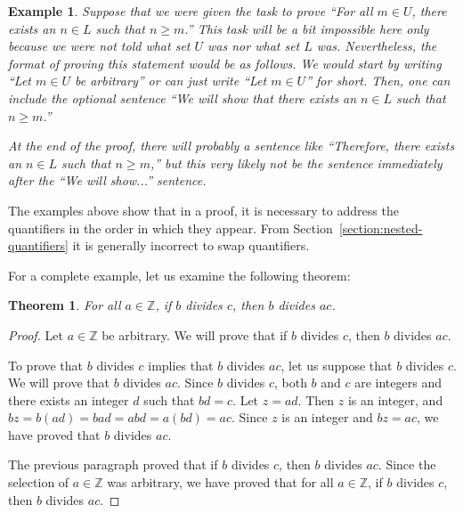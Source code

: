 \documentclass{book}
\newcounter{ekcounter}%
\theoremstyle{ekimcustom}
\newtheorem{theorem}[ekcounter]{Theorem}
\newtheorem{example}[ekcounter]{Example}
\begin{document}
\begin{example}
Suppose that we were given the task to prove ``For all $m \in U$, there exists an $n \in L$ such that $n \geq m$.'' This task will be a bit impossible here only because we were not told what set $U$ was nor what set $L$ was. Nevertheless, the format of proving this statement would be as follows. We would start by writing ``Let $m \in U$ be arbitrary'' or can just write ``Let $m \in U$'' for short. Then, one can include the optional sentence ``We will show that there exists an $n \in L$ such that $n \geq m$.''

At the end of the proof, there will probably a sentence like ``Therefore, there exists an $n \in L$ such that $n \geq m$,'' but this very likely not be the sentence immediately after the ``We will show...'' sentence.
\end{example}

The examples above show that in a proof, it is necessary to address the quantifiers in the order in which they appear. From Section~\ref{section:nested-quantifiers} it is generally incorrect to swap quantifiers.


For a complete example, let us examine the following theorem:
\begin{theorem}\label{theorem:forall-a-if-b-div-c}
For all $a \in \mathbb{Z}$, if $b$ divides $c$, then $b$ divides $ac$.
\end{theorem}
\begin{proof}
Let $a \in \mathbb{Z}$ be arbitrary. We will prove that if $b$ divides $c$, then $b$ divides $ac$.

To prove that $b$ divides $c$ implies that $b$ divides $ac$, let us suppose that $b$ divides $c$. We will prove that $b$ divides $ac$. Since $b$ divides $c$, both $b$ and $c$ are integers and there exists an integer $d$ such that $bd=c$. Let $z=ad$. Then $z$ is an integer, and $bz=b(ad)=bad=abd=a(bd)=ac$. Since $z$ is an integer and $bz=ac$, we have proved that $b$ divides $ac$.

The previous paragraph proved that if $b$ divides $c$, then $b$ divides $ac$. Since the selection of $a \in \mathbb{Z}$ was arbitrary, we have proved that for all $a \in \mathbb{Z}$, if $b$ divides $c$, then $b$ divides $ac$.
\end{proof}
\end{document}
